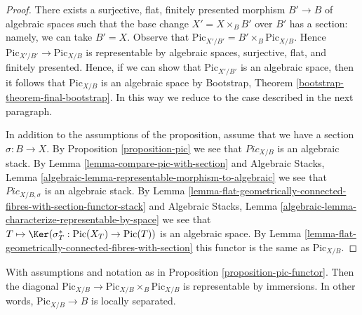 \begin{proof}
There exists a surjective, flat, finitely presented morphism
$B' \to B$ of algebraic spaces such that the base change $X' = X \times_B B'$
over $B'$ has a section: namely, we can take $B' = X$.
Observe that $\text{Pic}_{X'/B'} = B' \times_B \text{Pic}_{X/B}$.
Hence $\text{Pic}_{X'/B'} \to \text{Pic}_{X/B}$ is representable
by algebraic spaces, surjective, flat, and finitely presented.
Hence, if we can show that $\text{Pic}_{X'/B'}$ is an algebraic space,
then it follows that $\text{Pic}_{X/B}$
is an algebraic space by Bootstrap, Theorem
\ref{bootstrap-theorem-final-bootstrap}.
In this way we reduce to the case described in the next paragraph.

\medskip\noindent
In addition to the assumptions of the proposition, assume that
we have a section $\sigma : B \to X$. By
Proposition \ref{proposition-pic} we see that
$\textit{Pic}_{X/B}$ is an algebraic stack.
By Lemma \ref{lemma-compare-pic-with-section} and
Algebraic Stacks, Lemma
\ref{algebraic-lemma-representable-morphism-to-algebraic}
we see that $\textit{Pic}_{X/B, \sigma}$ is an algebraic stack.
By Lemma
\ref{lemma-flat-geometrically-connected-fibres-with-section-functor-stack}
and Algebraic Stacks, Lemma
\ref{algebraic-lemma-characterize-representable-by-space}
we see that $T \mapsto \Ker(\sigma_T^* : \text{Pic}(X_T) \to \text{Pic}(T))$
is an algebraic space.
By Lemma \ref{lemma-flat-geometrically-connected-fibres-with-section}
this functor is the same as $\text{Pic}_{X/B}$.
\end{proof}

\begin{lemma}
\label{lemma-diagonal-pic}
With assumptions and notation as in Proposition \ref{proposition-pic-functor}.
Then the diagonal
$\text{Pic}_{X/B} \to \text{Pic}_{X/B} \times_B \text{Pic}_{X/B}$
is representable by immersions. In other words, $\text{Pic}_{X/B} \to B$
is locally separated.
\end{lemma}

